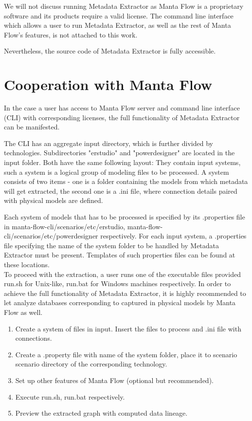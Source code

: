 \documentclass[12pt,a4paper]{report}
\begin{document}
We will not discuss running Metadata Extractor as Manta Flow is a proprietary software and its products require a valid license. 
The command line interface which allows a user to run Metadata Extractor, as well as the rest of Manta Flow's features, is not attached to this work.

Nevertheless, the source code of Metadata Extractor is fully accessible.

\section{Cooperation with Manta Flow}

In the case a user has access to Manta Flow server and command line interface (CLI) with corresponding licenses, the full functionality of Metadata Extractor can be manifested.

The CLI has an aggregate input directory, which is further divided by technologies.
Subdirectories "erstudio" and "powerdesigner" are located in the input folder.  
Both have the same following layout: 
They contain input systems, such a system is a logical group of modeling files to be processed.
A system consists of two items - one is a folder containing the models from which metadata will get extracted, the second one is a .ini file, where connection details paired with physical models are defined.

Each system of models that has to be processed is specified by its .properties file in manta-flow-cli/scenarios/etc/erstudio, manta-flow-cli/scenarios/etc/powerdesigner respectively. 
For each input system, a .properties file specifying the name of the system folder to be handled by Metadata Extractor must be present. Templates of such properties files can be found at these locations. \\ 

To proceed with the extraction, a user runs one of the executable files provided \textunderscore run.sh for Unix-like, \textunderscore run.bat for Windows machines respectively. In order to achieve the full functionality of Metadata Extractor, it is highly recommended to let analyze databases corresponding to captured in physical models by Manta Flow as well.

\begin{enumerate}
	\item Create a system of files in input. Insert the files to process and .ini file with connections.
	\item Create a .property file with name of the system folder, place it to scenario scenario directory of the corresponding technology.
	\item Set up other features of Manta Flow (optional but recommended).
	\item Execute \textunderscore run.sh, \textunderscore run.bat respectively.
	\item Preview the extracted graph with computed data lineage.
\end{enumerate}
\end{document}
